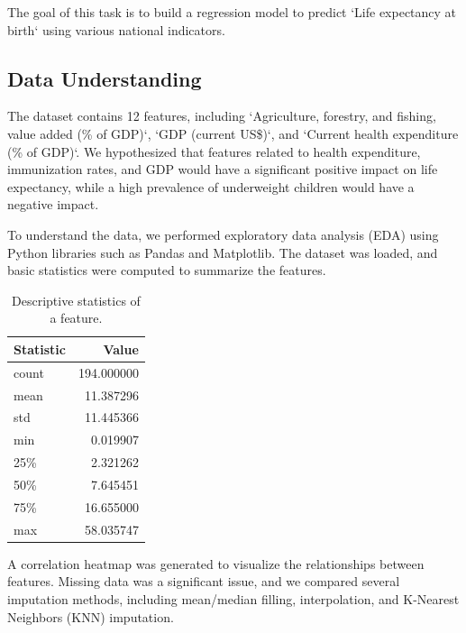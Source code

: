 \documentclass{article}
\begin{document}
The goal of this task is to build a regression model to predict `Life expectancy at birth` using various national indicators.
\subsection{Data Understanding}
\label{ssec:data_understanding}

The dataset contains 12 features, including `Agriculture, forestry, and fishing, value added (\% of GDP)`, `GDP (current US\$)`, and `Current health expenditure (\% of GDP)`. We hypothesized that features related to health expenditure, immunization rates, and GDP would have a significant positive impact on life expectancy, while a high prevalence of underweight children would have a negative impact.

To understand the data, we performed exploratory data analysis (EDA) using Python libraries such as Pandas and Matplotlib. The dataset was loaded, and basic statistics were computed to summarize the features.
\begin{table}[h]
    \centering
    \begin{tabular}{|l|r|}
        \hline
        \textbf{Statistic} & \textbf{Value} \\
        \hline
        count & 194.000000 \\
        mean & 11.387296 \\
        std & 11.445366 \\
        min & 0.019907 \\
        25\% & 2.321262 \\
        50\% & 7.645451 \\
        75\% & 16.655000 \\
        max & 58.035747 \\
        \hline
    \end{tabular}
    \caption{Descriptive statistics of a feature.}
    \label{tab:desc_stats}
\end{table}

A correlation heatmap was generated to visualize the relationships between features. Missing data was a significant issue, and we compared several imputation methods, including mean/median filling, interpolation, and K-Nearest Neighbors (KNN) imputation.
\end{document}
